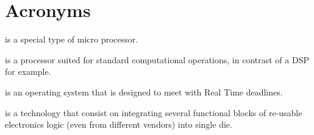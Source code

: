 \chapter{Acronyms}

\begin{acronym}

 is a special type of micro processor.


 is a processor suited for standard computational operations, in contrast of a \ac{DSP} for example.




 is an operating system that is designed to meet with Real Time deadlines.

 is a technology that consist on integrating several functional blocks of re-usable electronics logic (even from different vendors) into single die.


\end{acronym}

